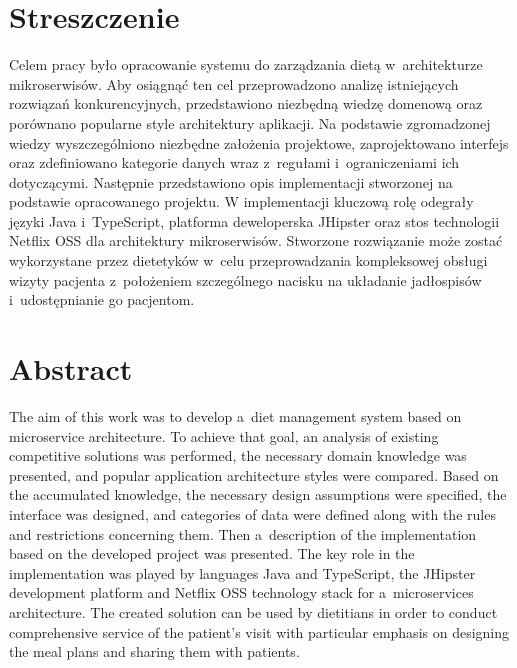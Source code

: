 \chapter*{Streszczenie} %
Celem pracy było opracowanie systemu do zarządzania dietą w~architekturze mikroserwisów.
Aby osiągnąć ten cel przeprowadzono analizę istniejących rozwiązań konkurencyjnych, 
przedstawiono niezbędną wiedzę domenową oraz porównano popularne style architektury aplikacji.
Na podstawie zgromadzonej wiedzy wyszczególniono niezbędne założenia projektowe, zaprojektowano interfejs 
oraz zdefiniowano kategorie danych wraz z~regułami i~ograniczeniami ich dotyczącymi.
Następnie przedstawiono opis implementacji stworzonej na podstawie opracowanego projektu.
W implementacji kluczową rolę odegrały języki Java i~TypeScript, platforma deweloperska JHipster 
oraz stos technologii Netflix OSS dla architektury mikroserwisów.
Stworzone rozwiązanie może zostać wykorzystane przez dietetyków w~celu przeprowadzania kompleksowej obsługi wizyty pacjenta 
z~położeniem szczególnego nacisku na układanie jadłospisów i~udostępnianie go pacjentom.


\begingroup
\renewcommand{\cleardoublepage}{}
\renewcommand{\clearpage}{}
\chapter*{Abstract} %
The aim of this work was to develop a~diet management system based on microservice architecture.
To achieve that goal, an analysis of existing competitive solutions was performed, the necessary domain knowledge was presented, 
and popular application architecture styles were compared.
Based on the accumulated knowledge, the necessary design assumptions were specified, the interface was designed, 
and categories of data were defined along with the rules and restrictions concerning them.
Then a~description of the implementation based on the developed project was presented.
The key role in the implementation was played by languages Java and TypeScript, 
the JHipster development platform and Netflix OSS technology stack for a~microservices architecture.
The created solution can be used by dietitians in order to conduct comprehensive service of the patient's visit 
with particular emphasis on designing the meal plans and sharing them with patients.
\endgroup
{}
